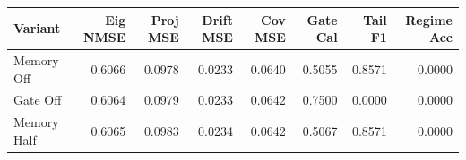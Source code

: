 \begin{tabular}{lrrrrrrr}
\toprule
Variant & Eig NMSE & Proj MSE & Drift MSE & Cov MSE & Gate Cal & Tail F1 & Regime Acc \\
\midrule
Memory Off & 0.6066 & 0.0978 & 0.0233 & 0.0640 & 0.5055 & 0.8571 & 0.0000 \\
Gate Off & 0.6064 & 0.0979 & 0.0233 & 0.0642 & 0.7500 & 0.0000 & 0.0000 \\
Memory Half & 0.6065 & 0.0983 & 0.0234 & 0.0642 & 0.5067 & 0.8571 & 0.0000 \\
\bottomrule
\end{tabular}